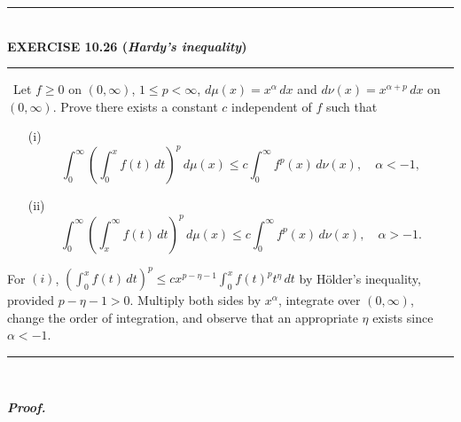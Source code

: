 \documentclass[a4paper,11pt]{article}
\begin{document}
	\begin{flushleft}
		\rule[-0.5ex]{17cm}{2pt}\\
			\textbf{EXERCISE 10.26 (\textit{Hardy's inequality})}\\
		\rule[1.5ex]{17cm}{0.5pt}\
			Let $f \geq 0$ on $(0,\infty)$, $1 \leq p < \infty$, $d\mu(x) = x^\alpha\,dx$ and $d\nu(x) = x^{\alpha + p}\,dx$ on $(0,\infty)$. Prove there exists a constant $c$ independent of $f$ such that
			\begin{enumerate}
				\item[(i)]
					$$\int_0^\infty (\int_0^x f(t)\,dt)^p\,d\mu(x)
					\leq c\int_0^\infty f^p(x)\,d\nu(x),
					\quad \alpha < -1,$$

				\item[(ii)]
					$$\int_0^\infty (\int_x^\infty f(t)\,dt)^p\,d\mu(x)
					\leq c \int_0^\infty f^p(x)\,d\nu(x),
					\quad \alpha > -1.$$
			\end{enumerate}

			For $(i)$, $(\int_0^x f(t)\,dt)^p \leq cx^{p-\eta-1} \int_0^x f(t)^p t^\eta\,dt$ by H\"older's inequality, provided $p - \eta - 1 > 0$. Multiply both sides by $x^\alpha$, integrate over $(0,\infty)$, change the order of integration, and observe that an appropriate $\eta$ exists since $\alpha < -1$.
		\rule[1.0ex]{17cm}{0.5pt}\
	\end{flushleft}
	\textit{\textbf {Proof.}}
\end{document}
